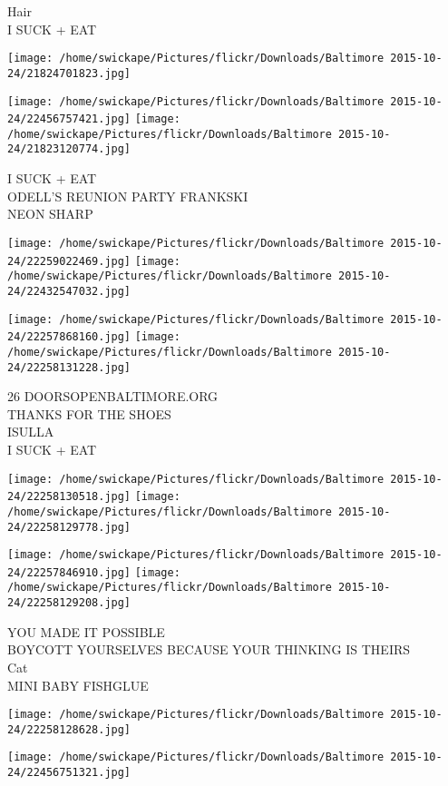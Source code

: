 \documentclass[10pt,letterpaper]{article}
\begin{document}
Hair\\
I SUCK + EAT
\pagebreak

\texttt{[image: /home/swickape/Pictures/flickr/Downloads/Baltimore 2015-10-24/21824701823.jpg]}

\vspace{0.25in}
\texttt{[image: /home/swickape/Pictures/flickr/Downloads/Baltimore 2015-10-24/22456757421.jpg]}
\texttt{[image: /home/swickape/Pictures/flickr/Downloads/Baltimore 2015-10-24/21823120774.jpg]}

I SUCK + EAT\\
ODELL'S REUNION PARTY FRANKSKI\\
NEON SHARP
\pagebreak

\texttt{[image: /home/swickape/Pictures/flickr/Downloads/Baltimore 2015-10-24/22259022469.jpg]}
\texttt{[image: /home/swickape/Pictures/flickr/Downloads/Baltimore 2015-10-24/22432547032.jpg]}

\texttt{[image: /home/swickape/Pictures/flickr/Downloads/Baltimore 2015-10-24/22257868160.jpg]}
\texttt{[image: /home/swickape/Pictures/flickr/Downloads/Baltimore 2015-10-24/22258131228.jpg]}

26 DOORSOPENBALTIMORE.ORG\\
THANKS FOR THE SHOES\\
ISULLA\\
I SUCK + EAT
\pagebreak

\texttt{[image: /home/swickape/Pictures/flickr/Downloads/Baltimore 2015-10-24/22258130518.jpg]}
\texttt{[image: /home/swickape/Pictures/flickr/Downloads/Baltimore 2015-10-24/22258129778.jpg]}

\texttt{[image: /home/swickape/Pictures/flickr/Downloads/Baltimore 2015-10-24/22257846910.jpg]}
\texttt{[image: /home/swickape/Pictures/flickr/Downloads/Baltimore 2015-10-24/22258129208.jpg]}

YOU MADE IT POSSIBLE\\
BOYCOTT YOURSELVES BECAUSE YOUR THINKING IS THEIRS\\
Cat\\
MINI BABY FISHGLUE
\pagebreak

\texttt{[image: /home/swickape/Pictures/flickr/Downloads/Baltimore 2015-10-24/22258128628.jpg]}

\vspace{0.25in}
\texttt{[image: /home/swickape/Pictures/flickr/Downloads/Baltimore 2015-10-24/22456751321.jpg]}
\end{document}
